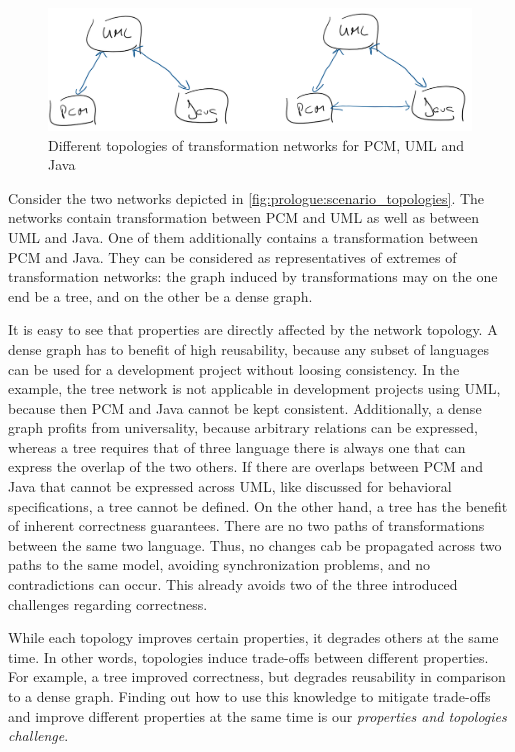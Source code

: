 \begin{figure}
    \centering
    \includegraphics[width=\textwidth]{figures/prologue/scenario_topologies.png}
    \caption[Example for network topologies]{Different topologies of transformation networks for \gls{PCM}, \gls{UML} and Java}
    \label{fig:prologue:scenario_topologies}
\end{figure}

Consider the two networks depicted in \autoref{fig:prologue:scenario_topologies}.
The networks contain transformation between \gls{PCM} and \gls{UML} as well as between \gls{UML} and Java. 
One of them additionally contains a transformation between \gls{PCM} and Java.
They can be considered as representatives of extremes of transformation networks:
the graph induced by transformations may on the one end be a tree, and on the other be a dense graph.

It is easy to see that properties are directly affected by the network topology.
A dense graph has to benefit of high reusability, because any subset of languages can be used for a development project without loosing consistency.
In the example, the tree network is not applicable in development projects using \gls{UML}, because then \gls{PCM} and Java cannot be kept consistent.
Additionally, a dense graph profits from universality, because arbitrary relations can be expressed, whereas a tree requires that of three language there is always one that can express the overlap of the two others.
If there are overlaps between \gls{PCM} and Java that cannot be expressed across \gls{UML}, like discussed for behavioral specifications, a tree cannot be defined.
On the other hand, a tree has the benefit of inherent correctness guarantees.
There are no two paths of transformations between the same two language.
Thus, no changes cab be propagated across two paths to the same model, avoiding synchronization problems, and no contradictions can occur.
This already avoids two of the three introduced challenges regarding correctness.

While each topology improves certain properties, it degrades others at the same time.
In other words, topologies induce trade-offs between different properties.
For example, a tree improved correctness, but degrades reusability in comparison to a dense graph.
Finding out how to use this knowledge to mitigate trade-offs and improve different properties at the same time is our \emph{properties and topologies challenge}.

